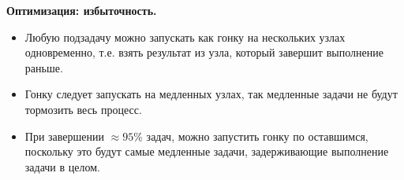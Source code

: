 \textbf{Оптимизация: избыточность.}
\begin{itemize}
  \item Любую подзадачу можно запускать как гонку на нескольких узлах
    одновременно, т.е. взять результат из узла, который завершит выполнение
    раньше.
  \item Гонку следует запускать на медленных узлах, так медленные задачи не
    будут тормозить весь процесс.
  \item При завершении $\approx 95\%$ задач, можно запустить гонку по
    оставшимся, поскольку это будут самые медленные задачи, задерживающие
    выполнение задачи в целом.
\end{itemize}
